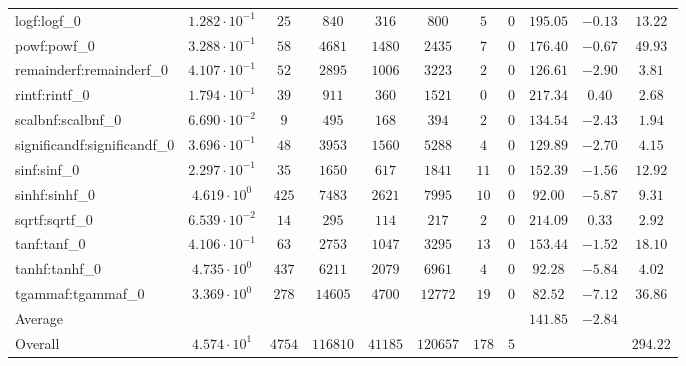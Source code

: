 \begin{tabular}{|l|c|c|c|c|c|c|c|c|c|c|}
logf:logf\_0                 & $ 1.282 \cdot 10^{-1} $ & $ 25     $ & $ 840    $ & $ 316   $ & $ 800    $ & $ 5   $ & $ 0 $ & $ 195.05      $ & $ -0.13   $ & $ 13.22   $ \\
powf:powf\_0                 & $ 3.288 \cdot 10^{-1} $ & $ 58     $ & $ 4681   $ & $ 1480  $ & $ 2435   $ & $ 7   $ & $ 0 $ & $ 176.40      $ & $ -0.67   $ & $ 49.93   $ \\
remainderf:remainderf\_0     & $ 4.107 \cdot 10^{-1} $ & $ 52     $ & $ 2895   $ & $ 1006  $ & $ 3223   $ & $ 2   $ & $ 0 $ & $ 126.61      $ & $ -2.90   $ & $ 3.81    $ \\
rintf:rintf\_0               & $ 1.794 \cdot 10^{-1} $ & $ 39     $ & $ 911    $ & $ 360   $ & $ 1521   $ & $ 0   $ & $ 0 $ & $ 217.34      $ & $ 0.40    $ & $ 2.68    $ \\
scalbnf:scalbnf\_0           & $ 6.690 \cdot 10^{-2} $ & $ 9      $ & $ 495    $ & $ 168   $ & $ 394    $ & $ 2   $ & $ 0 $ & $ 134.54      $ & $ -2.43   $ & $ 1.94    $ \\
significandf:significandf\_0 & $ 3.696 \cdot 10^{-1} $ & $ 48     $ & $ 3953   $ & $ 1560  $ & $ 5288   $ & $ 4   $ & $ 0 $ & $ 129.89      $ & $ -2.70   $ & $ 4.15    $ \\
sinf:sinf\_0                 & $ 2.297 \cdot 10^{-1} $ & $ 35     $ & $ 1650   $ & $ 617   $ & $ 1841   $ & $ 11  $ & $ 0 $ & $ 152.39      $ & $ -1.56   $ & $ 12.92   $ \\
sinhf:sinhf\_0               & $ 4.619 \cdot 10^{0}  $ & $ 425    $ & $ 7483   $ & $ 2621  $ & $ 7995   $ & $ 10  $ & $ 0 $ & $ 92.00       $ & $ -5.87   $ & $ 9.31    $ \\
sqrtf:sqrtf\_0               & $ 6.539 \cdot 10^{-2} $ & $ 14     $ & $ 295    $ & $ 114   $ & $ 217    $ & $ 2   $ & $ 0 $ & $ 214.09      $ & $ 0.33    $ & $ 2.92    $ \\
tanf:tanf\_0                 & $ 4.106 \cdot 10^{-1} $ & $ 63     $ & $ 2753   $ & $ 1047  $ & $ 3295   $ & $ 13  $ & $ 0 $ & $ 153.44      $ & $ -1.52   $ & $ 18.10   $ \\
tanhf:tanhf\_0               & $ 4.735 \cdot 10^{0}  $ & $ 437    $ & $ 6211   $ & $ 2079  $ & $ 6961   $ & $ 4   $ & $ 0 $ & $ 92.28       $ & $ -5.84   $ & $ 4.02    $ \\
tgammaf:tgammaf\_0           & $ 3.369 \cdot 10^{0}  $ & $ 278    $ & $ 14605  $ & $ 4700  $ & $ 12772  $ & $ 19  $ & $ 0 $ & $ 82.52       $ & $ -7.12   $ & $ 36.86   $ \\
\hline
Average                      & $                     $ & $        $ & $        $ & $       $ & $        $ & $     $ & $   $ & $ 141.85      $ & $ -2.84   $ & $         $ \\
\hline
Overall                      & $ 4.574 \cdot 10^{1}  $ & $ 4754   $ & $ 116810 $ & $ 41185 $ & $ 120657 $ & $ 178 $ & $ 5 $ & $             $ & $         $ & $ 294.22  $ \\
\hline
\end{tabular}

